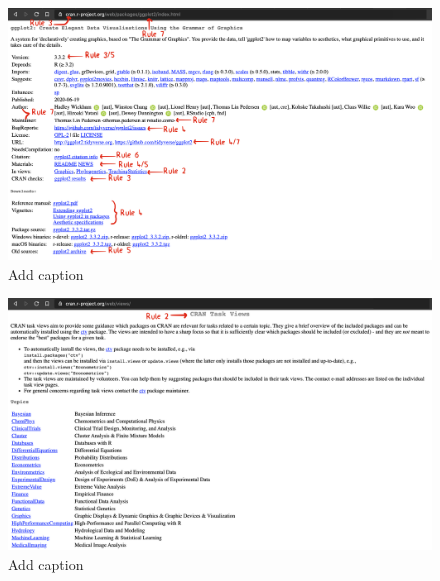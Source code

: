 \documentclass[10pt,letterpaper]{article}
\begin{document}
\begin{figure}
\includegraphics[width=1\linewidth]{../figures/cran_ggplot2} \caption{Add caption}\label{fig:cran_ggplot2}
\end{figure}

\begin{figure}
\includegraphics[width=1\linewidth]{../figures/cran_task_views} \caption{Add caption}\label{fig:cran_task_views}
\end{figure}
\end{document}
